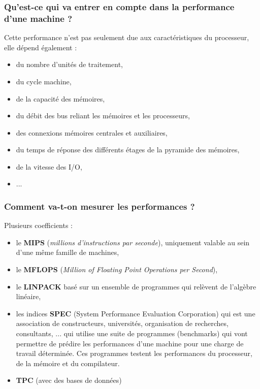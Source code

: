 \documentclass[10pt,a4paper,oneside,titlepage]{report}
\begin{document}
\subsubsection{Qu'est-ce qui va entrer en compte dans la performance d'une machine ?}

Cette performance n'est pas seulement due aux caractéristiques du processeur, elle dépend également :
\begin{itemize}
\item du nombre d'unités de traitement,
\item du cycle machine,
\item de la capacité des mémoires,
\item du débit des bus reliant les mémoires et les processeurs,
\item des connexions mémoires centrales et auxiliaires,
\item du temps de réponse des différents étages de la pyramide des mémoires,
\item de la vitesse des I/O,
\item ...
\end{itemize}

\subsubsection{Comment va-t-on mesurer les performances ?}

Plusieurs coefficients : \begin{itemize}
\item le \textbf{MIPS} (\textit{millions d'instructions par seconde}), uniquement valable au sein d'une m\^eme famille de machines,
\item le \textbf{MFLOPS} (\textit{Million of Floating Point Operations per Second}),
\item le \textbf{LINPACK} basé sur un ensemble de programmes qui relèvent de l'algèbre linéaire,
\item les indices \textbf{SPEC} (System Performance Evaluation Corporation) qui est une association de constructeurs, universités, organisation de recherches, consultants, ... qui utilise une suite de programmes (benchmarks) qui vont permettre de
prédire les performances d'une machine pour une charge de travail déterminée. Ces programmes testent les performances du processeur, de la mémoire et du compilateur.
\item \textbf{TPC} (avec des bases de données)
\end{itemize}
\end{document}
